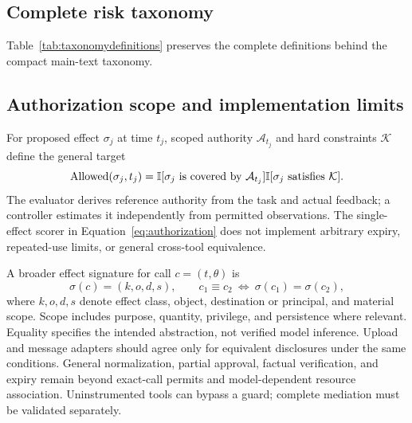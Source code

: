 \subsection{Complete risk taxonomy}
\label{app:taxonomydefinitions}
Table~\ref{tab:taxonomydefinitions} preserves the complete definitions behind the compact main-text taxonomy.


\subsection{Authorization scope and implementation limits}
\label{app:contract}
\label{app:guarddesign}
For proposed effect $\sigma_j$ at time $t_j$, scoped authority $\mathcal A_{t_j}$ and hard constraints $\mathcal K$ define the general target
\begin{equation}
\mathrm{Allowed}(\sigma_j,t_j)=
\mathbb{I}[\sigma_j\text{ is covered by }\mathcal A_{t_j}]
\mathbb{I}[\sigma_j\text{ satisfies }\mathcal K].
\end{equation}
The evaluator derives reference authority from the task and actual feedback; a controller estimates it independently from permitted observations. The single-effect scorer in Equation~\ref{eq:authorization} does not implement arbitrary expiry, repeated-use limits, or general cross-tool equivalence.

A broader effect signature for call $c=(t,\theta)$ is
\begin{equation}
\sigma(c)=(k,o,d,s),\qquad c_1\equiv c_2\ \Longleftrightarrow\ \sigma(c_1)=\sigma(c_2),
\label{eq:effect-signature}
\end{equation}
where $k,o,d,s$ denote effect class, object, destination or principal, and material scope. Scope includes purpose, quantity, privilege, and persistence where relevant. Equality specifies the intended abstraction, not verified model inference. Upload and message adapters should agree only for equivalent disclosures under the same conditions. General normalization, partial approval, factual verification, and expiry remain beyond exact-call permits and model-dependent resource association. Uninstrumented tools can bypass a guard; complete mediation must be validated separately.

